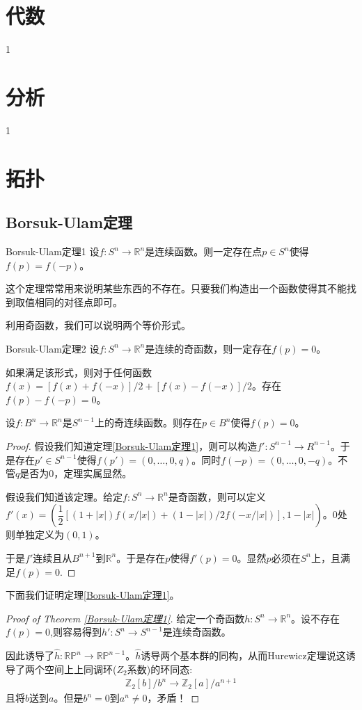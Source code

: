 \documentclass{package/fancy-book}
\newcommand{\Z}{\mathbb{Z}}
\newcommand{\R}{\mathbb{R}}
\newcommand{\RP}{\mathbb{RP}}
\begin{document}
\chapter{代数}
1
\chapter{分析}
1
\chapter{拓扑}
\section{Borsuk-Ulam定理}
\begin{theorem}{Borsuk-Ulam定理1}
    设$f:S^n \to \mathbb{R}^n$是连续函数。则一定存在点$p \in S^n$使得$f(p)=f(-p)$。
\end{theorem}

这个定理常常用来说明某些东西的不存在。只要我们构造出一个函数使得其不能找到取值相同的对径点即可。

利用奇函数，我们可以说明两个等价形式。
\begin{theorem}{Borsuk-Ulam定理2}
    设$f:S^n \to \R^n$是连续的奇函数，则一定存在$f(p)=0$。
\end{theorem}
如果满足该形式，则对于任何函数$f(x)=[f(x)+f(-x)]/2+[f(x)-f(-x)]/2$。存在$f(p)-f(-p)=0$。

\begin{theorem}{}
    设$f:B^n \to \R^n$是$S^{n-1}$上的奇连续函数。则存在$p\in B^n$使得$f(p)=0$。
\end{theorem}
\begin{proof}
    假设我们知道定理\ref{Borsuk-Ulam定理1}，则可以构造$f':S^{n-1} \to R^{n-1}$。于是存在$p' \in S^{n-1}$使得$f(p')=(0,\dots,0,q)$。同时$f(-p)=(0,\dots,0,-q)$。不管$q$是否为$0$，定理实属显然。

    假设我们知道该定理。给定$f:S^n \to \R^n$是奇函数，则可以定义$f'(x)=(\dfrac{1}{2}[(1+|x|)f(x/|x|)+(1-|x|)/2f(-x/|x|)],1-|x|)$。$0$处则单独定义为$(0,1)$。

    于是$f'$连续且从$B^{n+1}$到$\R^n$。于是存在$p$使得$f'(p)=0$。显然$p$必须在$S^n$上，且满足$f(p)=0$.
\end{proof}
下面我们证明定理\ref{Borsuk-Ulam定理1}。
\begin{proof}[Proof of Theorem \ref{Borsuk-Ulam定理1}]
    给定一个奇函数$h:S^n \to \R^n$。设不存在$f(p)=0$,则容易得到$h':S^n \to S^{n-1}$是连续奇函数。

    因此诱导了$\hat{h}: \RP^{n} \to \RP^{n-1}$。$\hat{h}$诱导两个基本群的同构，从而Hurewicz定理说这诱导了两个空间上上同调环($Z_2$系数)的环同态:
    \begin{align*}
        \Z_2[b]/b^n \to \Z_2[a]/a^{n+1}
    \end{align*}
    且将$b$送到$a$。但是$b^n=0$到$a^n\neq 0$，矛盾！
\end{proof}
\end{document}

